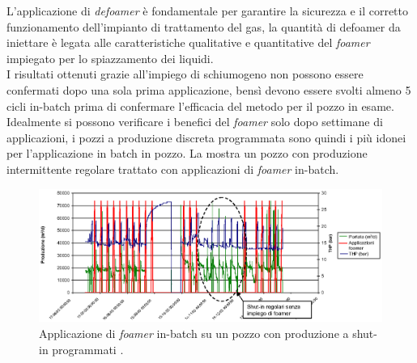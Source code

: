 L'applicazione di \textit{defoamer} è fondamentale per garantire la sicurezza e il corretto funzionamento dell'impianto di trattamento del gas, la quantità di defoamer da iniettare è legata alle caratteristiche qualitative e quantitative del \textit{foamer} impiegato per lo spiazzamento dei liquidi.\\
I risultati ottenuti grazie all'impiego di schiumogeno non possono essere confermati dopo una sola prima applicazione, bensì devono essere svolti almeno 5 cicli in-batch prima di confermare l'efficacia del metodo per il pozzo in esame. Idealmente si possono verificare i benefici del \textit{foamer} solo dopo settimane di applicazioni, i pozzi a produzione discreta programmata sono quindi i più idonei per l'applicazione in batch in pozzo. La  mostra un pozzo con produzione intermittente regolare trattato con applicazioni di \textit{foamer} in-batch.

\begin{figure}[htbp]
    \centering
    \includegraphics[width=\textwidth]{fig/foamer/batch-cycle.eps}
    \caption{Applicazione di \textit{foamer} in-batch su un pozzo con produzione a shut-in programmati \parencite{wittfeld2015foam}.}
    \label{fig:bacth-cycle}
\end{figure}


